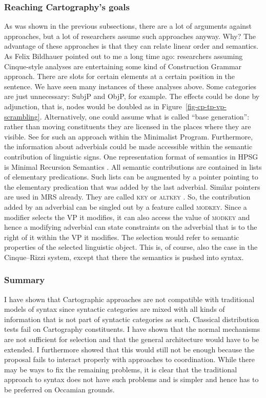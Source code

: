 \subsubsection{Reaching Cartography's goals}
\label{sec-Cinque-solution}

As was shown in the previous subsections, there are a lot of arguments against
\citeauthor{CR2010a} approaches, but a lot of researchers assume such approaches anyway. Why? The
advantage of these approaches is that they can relate linear order and semantics. As Felix Bildhauer
pointed out to me a long time ago: researchers assuming Cinque-style analyses are entertaining some kind of Construction Grammar
approach. There are slots for certain elements at a certain position in the sentence. We have seen
many instances of these analyses above. Some categories are just unnecessary: SubjP and ObjP, for
example. The effects could be done by adjunction, that is, nodes would be doubled as in
Figure~\ref{fig-cp-tp-vp-scrambling}. Alternatively, one could assume what is called ``base
generation'': rather than moving constituents they are licensed in the places where they are visible. See
\citet{Fanselow2001a} for such an approach within the Minimalist Program.
Furthermore, the information about adverbials could be made accessible
within the semantic contribution of linguistic signs. One representation format of semantics in HPSG
is Minimal Recursion Semantics \citep{CFPS2005a}. All semantic contributions are contained in lists of elementary
predications. Such lists can be augmented by a pointer pointing to the elementary predication that
was added by the last adverbial. Similar pointers are used in MRS already. They are called
\textsc{key} or \textsc{altkey} \parencites[Section~3.7]{FBO2003a-u}[]{CFPS2005a}. So, the contribution added by an adverbial can be singled out by a
feature called \textsc{modkey}. Since a modifier selects the VP it modifies, it can also access the value of \textsc{modkey} and hence a
modifying adverbial can state constraints on the adverbial that is to the right of it within the VP
it modifies. The selection would refer to semantic properties of the selected linguistic
object. This is, of course, also the case in the Cinque–Rizzi system, except that there the
semantics is pushed into syntax.

\subsubsection{Summary}

I have shown that Cartographic approaches are not compatible with traditional models of syntax since
syntactic categories are mixed with all kinds of information that is not part of syntactic
categories as such. Classical distribution tests fail on Cartography constituents. I have shown that
the normal mechanisms are not sufficient for selection and that the general architecture would have
to be extended. I furthermore showed that this would still not be enough because the proposal fails
to interact properly with approaches to coordination. While there may be ways to fix the remaining
problems, it is clear that the traditional approach to syntax does not have such problems and is
simpler and hence has to be preferred on Occamian grounds.


